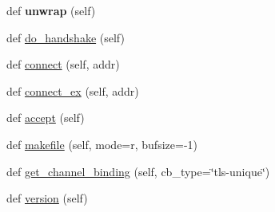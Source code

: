 \begin{DoxyCompactItemize}
def {\bfseries unwrap} (self)
\item 
def \hyperlink{classgevent_1_1__sslgte279_1_1_s_s_l_socket_ab37a8e533c90ed9088d59d8931f32f5d}{do\+\_\+handshake} (self)
\item 
def \hyperlink{classgevent_1_1__sslgte279_1_1_s_s_l_socket_a5bcf1de76a98dc749f0513434942aeac}{connect} (self, addr)
\item 
def \hyperlink{classgevent_1_1__sslgte279_1_1_s_s_l_socket_a09ce5d5c46bf2a4ec4f40ead9f5b4491}{connect\+\_\+ex} (self, addr)
\item 
def \hyperlink{classgevent_1_1__sslgte279_1_1_s_s_l_socket_ac178f1d3d472f4e3bf23788098986eb5}{accept} (self)
\item 
def \hyperlink{classgevent_1_1__sslgte279_1_1_s_s_l_socket_af55392ea328da9666f5ed8841db988fb}{makefile} (self, mode=\textquotesingle{}r\textquotesingle{}, bufsize=-\/1)
\item 
def \hyperlink{classgevent_1_1__sslgte279_1_1_s_s_l_socket_a75d6244909194c60d70a08b6bee82beb}{get\+\_\+channel\+\_\+binding} (self, cb\+\_\+type=\char`\"{}tls-\/unique\char`\"{})
\item 
def \hyperlink{classgevent_1_1__sslgte279_1_1_s_s_l_socket_a4d29c78ef2dfa4114a937a37c06f520c}{version} (self)
\end{DoxyCompactItemize}
